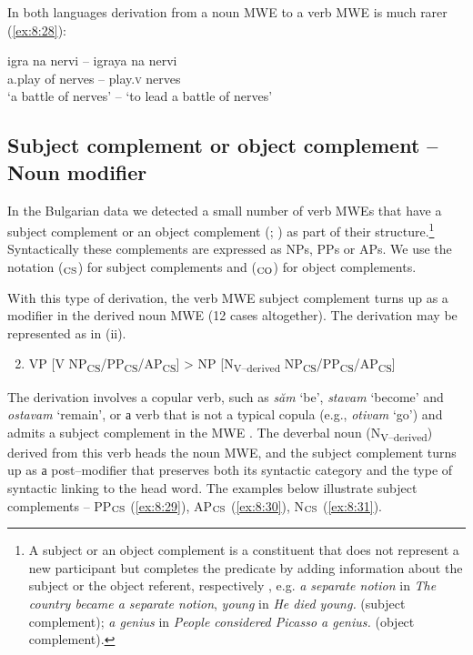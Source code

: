 \documentclass[output=paper]{langsci/langscibook}
\begin{document}
In both languages derivation from a noun MWE to a verb MWE is much rarer
(\ref{ex:8:28}):

\begin{exe}
\ex \label{ex:8:28}
\settowidth{}
\gll igra na nervi – igraya na nervi\\ 
 {a.play} of nerves – play.\textsc{v} {} nerves\\  
 \glt ‘a battle of nerves’ – ‘to lead a battle of nerves’
\end{exe}



\subsection{Subject complement or object complement – Noun modifier}
\label{section62}


In the Bulgarian data we detected a small number of verb MWEs that have
a subject complement or an object complement (\citealt{quirk1985}; \citealt{downing2014}) as part of their structure.\footnote{A subject or an 
object complement is a constituent that does not represent a new
participant but completes the predicate by adding information about the
subject or the object referent, respectively \citep{downing2014}, e.g. \textit{a
separate notion} in \textit{The country became a separate notion}, \textit{young} in
\textit{He died young.} (subject complement); \textit{a genius} in \textit{People considered
Picasso a genius.} (object complement).} Syntactically these
complements are expressed as NPs, PPs or APs. We use the notation
  ($_{\textup{CS}}$) for subject complements and  ($_{\textup{CO}}$)
for object complements. 

With this type of derivation, the verb MWE subject
complement turns up as a modifier in the derived noun MWE (12 cases
altogether). The derivation may be represented as in (ii).


\renewcommand{\theenumi}{(\roman{enumi})}%
\begin{enumerate}
 \setcounter{enumi}{1}
\item  VP [V
NP\textsubscript{CS}/PP\textsubscript{CS}/AP\textsubscript{CS}] > NP
[N\textsubscript{V–derived}
NP\textsubscript{CS}/PP\textsubscript{CS}/AP\textsubscript{CS}]
\end{enumerate}

The derivation involves a copular verb, such as \textit{săm} ‘be’, \textit{stavam}
‘become’ and \textit{ostavam} ‘remain’, or а verb that is not a typical
copula (e.g., \textit{otivam} ‘go’) and admits a subject complement in the
MWE . The deverbal noun (N\textsubscript{V–derived}) derived from this
verb heads the noun MWE, and the subject complement turns up as а
post–modifier that preserves both its syntactic category and the type
of syntactic linking to the head word. The examples below illustrate
subject complements – PP$_{\textup{CS}}$  (\ref{ex:8:29}), AP$_{\textup{CS}}$ (\ref{ex:8:30}), N$_{\textup{CS}}$  (\ref{ex:8:31}).
\end{document}
